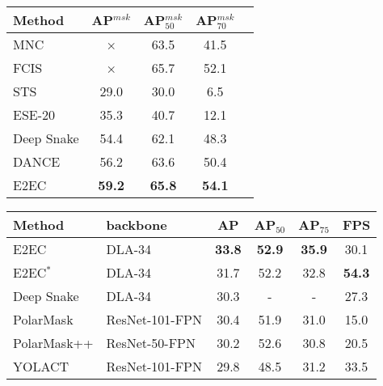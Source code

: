 \documentclass[10pt,twocolumn,letterpaper]{article}
\begin{document}
\begin{table*}[t]
\begin{minipage}[c]{0.26\linewidth}
\centering
  \setlength{\tabcolsep}{0.2mm}
  \begin{footnotesize}
  \begin{tabular}{l|c|ccc}
    Method & AP$^{msk}$ & AP$_{50}^{msk}$ & AP$_{70}^{msk}$ \\
    \hline
    MNC \cite{mnc} & × & 63.5 & 41.5 \\
    FCIS \cite{fcis} & × & 65.7 & 52.1\\
    STS \cite{sts} & 29.0 & 30.0 & 6.5 \\
    ESE-20 \cite{ese} & 35.3 & 40.7 & 12.1 \\
    Deep Snake \cite{deepsnake} & 54.4 & 62.1 & 48.3 \\
    DANCE \cite{dance} & 56.2 & 63.6 & 50.4 \\
    E2EC & \textbf{59.2} & \textbf{65.8} & \textbf{54.1} \\
  \end{tabular}
  \end{footnotesize}\vspace{-4mm}
  \caption{\textbf{Results on SBD val set.}}
  \label{tab:sbd}
\end{minipage}\hfill
\begin{minipage}[c]{0.02\linewidth}
\end{minipage}\hfill
\begin{minipage}[c]{0.42\linewidth}
\centering
  \setlength{\tabcolsep}{0.8mm}
  \begin{footnotesize}
  \begin{tabular}{l|l|ccc|c}
    Method & backbone & AP & AP$_{50}$ & AP$_{75}$ & FPS\\
    \hline
    E2EC & DLA-34 & \textbf{33.8} & \textbf{52.9} & \textbf{35.9} & 30.1\\
    E2EC$^{*}$ & DLA-34 & 31.7 & 52.2 & 32.8 & \textbf{54.3}\\
    Deep Snake \cite{deepsnake} & DLA-34 & 30.3 & - & - & 27.3 \\
    PolarMask \cite{polarmask} & ResNet-101-FPN & 30.4 & 51.9 & 31.0 & 15.0 \\
    PolarMask++ \cite{polarmask++}& ResNet-50-FPN & 30.2 & 52.6 & 30.8 & 20.5\\ 
    YOLACT \cite{yolact} & ResNet-101-FPN & 29.8 & 48.5 & 31.2 & 33.5\\
  \end{tabular}
  \end{footnotesize}\vspace{-3mm}

\end{minipage}
\end{table*}
\end{document}
